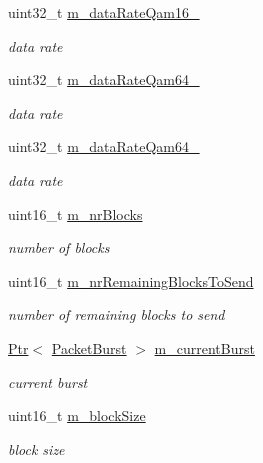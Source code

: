 \begin{DoxyCompactItemize}
uint32\+\_\+t \hyperlink{classns3_1_1SimpleOfdmWimaxPhy_a369a57bc52c9826a0e0ef3df5749447c}{m\+\_\+data\+Rate\+Qam16\+\_}
\begin{DoxyCompactList}\small\item\em data rate \end{DoxyCompactList}\item 
uint32\+\_\+t \hyperlink{classns3_1_1SimpleOfdmWimaxPhy_afada894ff462ecd3571c52b0b6ecfaa7}{m\+\_\+data\+Rate\+Qam64\+\_}
\begin{DoxyCompactList}\small\item\em data rate \end{DoxyCompactList}\item 
uint32\+\_\+t \hyperlink{classns3_1_1SimpleOfdmWimaxPhy_a6d82d4887585a80a3617002b9f674a12}{m\+\_\+data\+Rate\+Qam64\+\_}
\begin{DoxyCompactList}\small\item\em data rate \end{DoxyCompactList}\item 
uint16\+\_\+t \hyperlink{classns3_1_1SimpleOfdmWimaxPhy_a391e4fe297758baff33fac4790a9dc95}{m\+\_\+nr\+Blocks}
\begin{DoxyCompactList}\small\item\em number of blocks \end{DoxyCompactList}\item 
uint16\+\_\+t \hyperlink{classns3_1_1SimpleOfdmWimaxPhy_ab620d0d5dfe17d488f58af20e0af6113}{m\+\_\+nr\+Remaining\+Blocks\+To\+Send}
\begin{DoxyCompactList}\small\item\em number of remaining blocks to send \end{DoxyCompactList}\item 
\hyperlink{classns3_1_1Ptr}{Ptr}$<$ \hyperlink{classns3_1_1PacketBurst}{Packet\+Burst} $>$ \hyperlink{classns3_1_1SimpleOfdmWimaxPhy_a4b9c8b10addab3e49f8a37264ee95b0a}{m\+\_\+current\+Burst}
\begin{DoxyCompactList}\small\item\em current burst \end{DoxyCompactList}\item 
uint16\+\_\+t \hyperlink{classns3_1_1SimpleOfdmWimaxPhy_a3f1a95a822adee3f7ceb2bb5a63db5c2}{m\+\_\+block\+Size}
\begin{DoxyCompactList}\small\item\em block size \end{DoxyCompactList}\item 

\end{DoxyCompactItemize}
